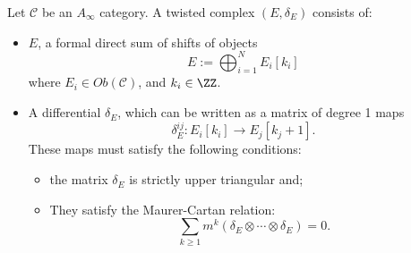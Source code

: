 
 
 
Let $\mathcal C$ be an $A_\infty$ category. A twisted complex $(E, \delta_E)$ consists of:
\begin{itemize}
\item $E$, a formal direct sum of shifts of objects
\[E:=\bigoplus_{i=1}^N E_i[k_i]\]
where $E_{i}\in Ob(\mathcal C)$, and $k_i\in \ZZ$.
\item  A differential $\delta_E$, which can be written as a matrix  of degree 1 maps
\[\delta^{ij}_E: E_i[k_i]\to E_j[k_j +1] .\] These maps must satisfy the following conditions:
\begin{itemize}
    \item the matrix $\delta_E$ is strictly upper triangular and;
    \item They satisfy the Maurer-Cartan relation:
    \[\sum_{k\geq 1} m^k (\delta_E\otimes\cdots \otimes \delta_E) =0.\]
\end{itemize}
\end{itemize}

 